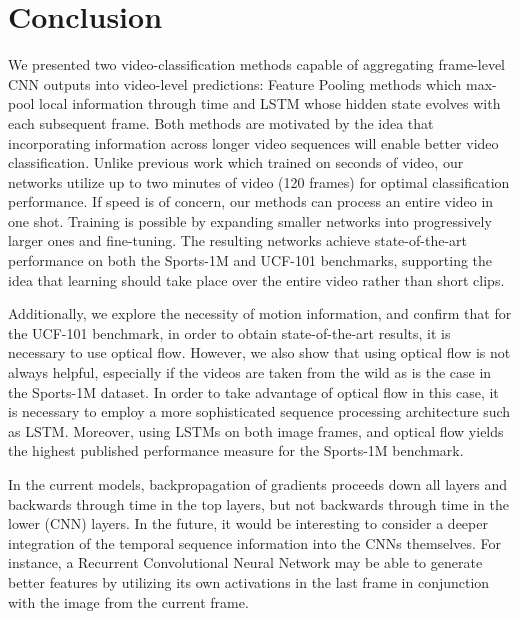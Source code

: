 \documentclass[10pt,twocolumn,letterpaper]{article}
\begin{document}
\section{Conclusion}\vspace{-1em}
We presented two video-classification methods capable of
aggregating frame-level CNN outputs into video-level predictions:
Feature Pooling methods which max-pool local information through time
and LSTM whose hidden state evolves with each subsequent frame. Both
methods are motivated by the idea that incorporating information across
longer video sequences will enable better video classification. Unlike
previous work which trained on seconds of video, our networks utilize
up to two minutes of video (120 frames) for optimal classification performance.
If speed is of concern, our methods can process an entire video in one shot.
Training is possible by expanding smaller networks into progressively larger
ones and fine-tuning. The resulting networks
achieve state-of-the-art performance on both the Sports-1M and UCF-101
benchmarks, supporting the idea that learning should take place over the entire
video rather than short clips.

Additionally, we explore the necessity of motion information, and
confirm that for the UCF-101 benchmark, in order to obtain
state-of-the-art results, it is necessary to use optical
flow. However, we also show that using optical flow is not always
helpful, especially if the videos are taken from the wild as is the
case in the Sports-1M dataset. In order to take advantage of optical
flow in this case, it is necessary to employ a more sophisticated
sequence processing architecture such as LSTM. Moreover, using LSTMs
on both image frames, and optical flow yields the highest published
performance measure for the Sports-1M benchmark.

In the current models, backpropagation of gradients proceeds down
all layers and backwards through time in the top layers, but
not backwards through time in the lower (CNN) layers. In the future,
it would be interesting to consider a deeper integration of the temporal sequence information
 into the CNNs themselves. For instance, a Recurrent Convolutional Neural Network may
be able to generate better features by utilizing its own activations
in the last frame in conjunction with the image from the current
frame.


{\small


}
\end{document}
